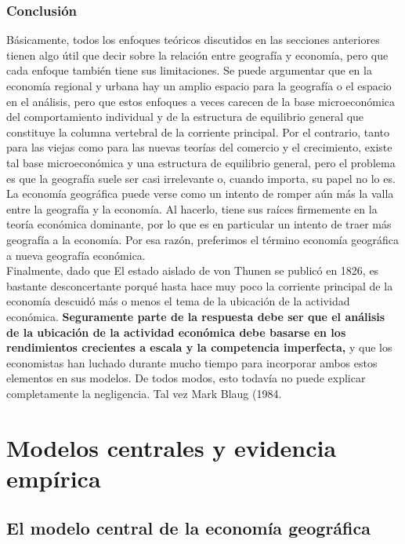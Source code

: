 \section{Conclusión}
Básicamente, todos los enfoques teóricos discutidos en las secciones anteriores tienen algo útil que decir sobre la relación entre geografía y economía, pero que cada enfoque también tiene sus limitaciones. Se puede argumentar que en la economía regional y urbana hay un amplio espacio para la geografía o el espacio en el análisis, pero que estos enfoques a veces carecen de la base microeconómica del comportamiento individual y de la estructura de equilibrio general que constituye la columna vertebral de la corriente principal. Por el contrario, tanto para las viejas como para las nuevas teorías del comercio y el crecimiento, existe tal base microeconómica y una estructura de equilibrio general, pero el problema es que la geografía suele ser casi irrelevante o, cuando importa, su papel no lo es. La economía geográfica puede verse como un intento de romper aún más la valla entre la geografía y la economía. Al hacerlo, tiene sus raíces firmemente en la teoría económica dominante, por lo que es en particular un intento de traer más geografía a la economía. Por esa razón, preferimos el término economía geográfica a nueva geografía económica.\\ 
Finalmente, dado que El estado aislado de von Thunen se publicó en 1826, es bastante desconcertante porqué hasta hace muy poco la corriente principal de la economía descuidó más o menos el tema de la ubicación de la actividad económica. \textbf{Seguramente parte de la respuesta debe ser que el análisis de la ubicación de la actividad económica debe basarse en los rendimientos crecientes a escala y la competencia imperfecta,} y que los economistas han luchado durante mucho tiempo para incorporar ambos estos elementos en sus modelos. De todos modos, esto todavía no puede explicar completamente la negligencia. Tal vez Mark Blaug (1984.

\part{Modelos centrales y evidencia empírica}

\chapter{El modelo central de la economía geográfica}
